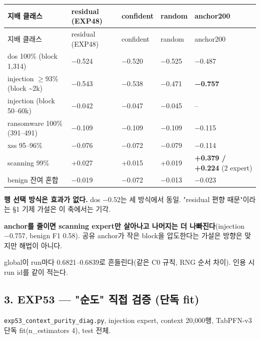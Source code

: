 \begingroup
\footnotesize
\begin{longtable}{>{\raggedright\arraybackslash}p{}>{\raggedleft\arraybackslash}p{}>{\raggedleft\arraybackslash}p{}>{\raggedleft\arraybackslash}p{}>{\raggedleft\arraybackslash}p{}}
\toprule
지배 클래스 & residual (EXP48) & confident & random & anchor200 \\ \midrule
\endfirsthead
지배 클래스 & residual (EXP48) & confident & random & anchor200 \\ \midrule
\endhead
{}dos 100\% (block 1,314) & −0.524 & −0.520 & −0.525 & −0.487 \\
{}injection \ensuremath{\geq}93\% (block \textasciitilde{}2k) & −0.543 & −0.538 & −0.471 & \textbf{−0.757} \\
{}injection (block 50–60k) & −0.042 & −0.047 & −0.045 & – \\
{}ransomware 100\% (391–491) & −0.109 & −0.109 & −0.109 & −0.115 \\
{}xss 95–96\% & −0.076 & −0.072 & −0.079 & −0.114 \\
{}scanning 99\% & +\allowbreak{}0.027 & +\allowbreak{}0.015 & +\allowbreak{}0.019 & \textbf{+\allowbreak{}0.379 /\allowbreak{} +\allowbreak{}0.224} (2 expert) \\
{}benign 잔여 혼합 & −0.019 & −0.072 & −0.013 & −0.023 \\
\bottomrule
\end{longtable}
\endgroup
\par\noindent \textbullet\enspace \textbf{행 선택 방식은 효과가 없다.} dos −0.52는 세 방식에서 동일. "residual 편향 때문"이라는 §1 기제 가설은 이 축에서는 기각.


\par\noindent \textbullet\enspace \textbf{anchor를 줄이면 scanning expert만 살아나고 나머지는 더 나빠진다}(injection −0.757, benign F1 0.58). 공유 anchor가 작은 block을 압도한다는 가설은 방향은 맞지만 해법이 아니다.


\par\noindent \textbullet\enspace global이 run마다 0.6821–0.6839로 흔들린다(같은 C0 규칙, RNG 순서 차이). 인용 시 run id를 같이 적는다.


\subsection{3. EXP53 — "순도" 직접 검증 (단독 fit)}
\texttt{exp53\_\allowbreak{}\allowbreak{}co\allowbreak{}ntext\_\allowbreak{}\allowbreak{}pu\allowbreak{}rity\_\allowbreak{}\allowbreak{}dia\allowbreak{}g.\allowbreak{}py}, injection expert, context 20,000행, TabPFN-v3 단독 fit(n\_\allowbreak{}estimators 4), test 전체.

